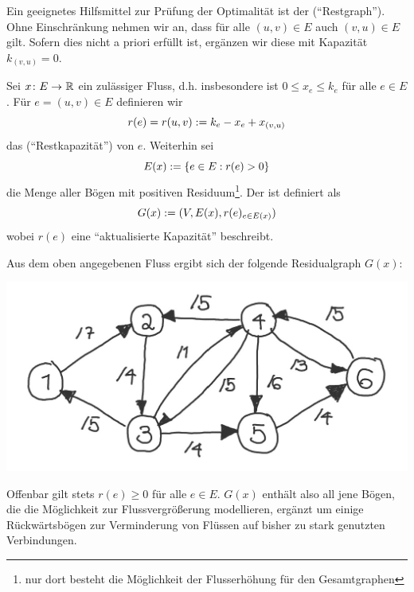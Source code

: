 Ein geeignetes Hilfsmittel zur Prüfung der Optimalität ist der  (\enquote{Restgraph}). Ohne Einschränkung nehmen wir an, dass für alle $(u,v) \in E$ auch $(v,u) \in E$ gilt. Sofern dies nicht a priori erfüllt ist, ergänzen wir diese mit Kapazität $k_{(v,u)} = 0$.

\begin{definition}
	Sei $\abb{x}{E}{\R}$ ein zulässiger Fluss, d.h. insbesondere ist $0 \le x_e \le k_e$ für alle $e \in E$. Für $e = (u,v) \in E$ definieren wir
	\begin{equation*}
		r(e) = r(u,v) \mathrel{:=} k_e - x_e + x_{(v,u)}
	\end{equation*}
	das  (\enquote{Restkapazität}) von $e$.
	Weiterhin sei
	\begin{equation*}
		E(x) \mathrel{:=} \left\{ e \in E : r(e) > 0 \right\}
	\end{equation*}
	die Menge aller Bögen mit positiven Residuum\footnote{nur dort besteht die Möglichkeit der Flusserhöhung für den Gesamtgraphen}. Der  ist definiert als
	\begin{equation*}
		G(x) \mathrel{:=} (V, E(x), r(e)_{e \in E(x)})
	\end{equation*}
	wobei $r(e)$ eine \enquote{aktualisierte Kapazität} beschreibt.
\end{definition}

\begin{beispiel}
	Aus dem oben angegebenen Fluss ergibt sich der folgende Residualgraph $G(x)$:

	\begin{center}
		\includegraphics[width=.5\linewidth]{./img/optinum_5_4_bsp5-4.jpg}
	\end{center}

	Offenbar gilt stets $r(e) \ge 0$ für alle $e \in E$. $G(x)$ enthält also all jene Bögen, die die Möglichkeit zur Flussvergrößerung modellieren, ergänzt um einige Rückwärtsbögen zur Verminderung von Flüssen auf bisher zu stark genutzten Verbindungen.
\end{beispiel}

